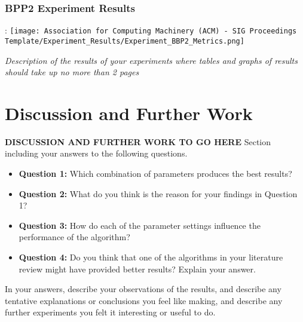 \documentclass[sigconf]{acmart}
\begin{document}
            \subsubsection{BPP2 Experiment Results}:\newline
                \texttt{[image: Association for Computing Machinery (ACM) - SIG Proceedings Template/Experiment\_Results/Experiment\_BBP2\_Metrics.png]}\newline
            
            \textit{Description of the results of your experiments where tables and graphs of results should take up no more than 2 pages}

    \section{Discussion and Further Work}
        \textbf{DISCUSSION AND FURTHER WORK TO GO HERE}\newline
        Section including your answers to the following questions.
        \begin{itemize}
            \item \textbf{Question 1:} Which combination of parameters produces the best results?
            \item \textbf{Question 2:} What do you think is the reason for your findings in Question 1?
            \item \textbf{Question 3:} How do each of the parameter settings influence the performance of the algorithm?
            \item \textbf{Question 4:} Do you think that one of the algorithms in your literature review might have provided better results? Explain your answer.\newline
        \end{itemize}
        
        
        In your answers, describe your observations of the results, and describe any tentative explanations or conclusions you feel like making, and describe any further experiments you felt it interesting or useful to do.

    \printbibliography
\end{document}
